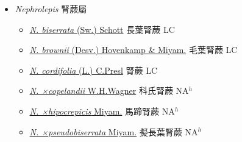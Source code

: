 
  \begin{itemize}
 \item[] \textit{Nephrolepis} 腎蕨屬
                    
  \begin{itemize}
        \item[] \href{http://www.theplantlist.org/tpl1.1/search?q=Nephrolepis+biserrata}{\textit{N. biserrata} (Sw.) Schott}   長葉腎蕨 LC
        \item[] \href{http://www.theplantlist.org/tpl1.1/search?q=Nephrolepis+brownii}{\textit{N. brownii} (Desv.) Hovenkamp \& Miyam.}     毛葉腎蕨 LC
        \item[] \href{http://www.theplantlist.org/tpl1.1/search?q=Nephrolepis+cordifolia}{\textit{N. cordifolia} (L.) C.Presl}     腎蕨 LC
        \item[] \href{http://www.theplantlist.org/tpl1.1/search?q=Nephrolepis+×copelandii}{\textit{N. ×copelandii} W.H.Wagner}   科氏腎蕨 NA$^h$
        \item[] \href{http://www.theplantlist.org/tpl1.1/search?q=Nephrolepis+×hipocrepicis}{\textit{N. ×hipocrepicis} Miyam.}   馬蹄腎蕨 NA$^h$
        \item[] \href{http://www.theplantlist.org/tpl1.1/search?q=Nephrolepis+×pseudobiserrata}{\textit{N. ×pseudobiserrata} Miyam.}   擬長葉腎蕨 NA$^h$
  \end{itemize}
  \end{itemize}
